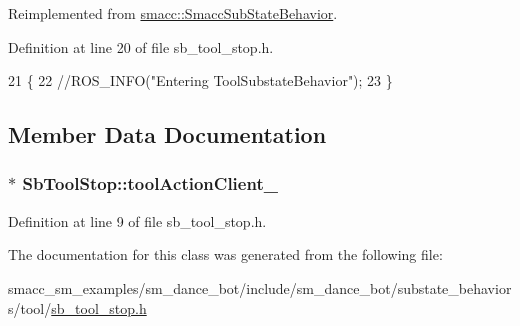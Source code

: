 Reimplemented from \hyperlink{classsmacc_1_1SmaccSubStateBehavior_a1f87ab55c1805b2a2fd9c022807d35b9}{smacc\+::\+Smacc\+Sub\+State\+Behavior}.



Definition at line 20 of file sb\+\_\+tool\+\_\+stop.\+h.


\begin{DoxyCode}
21     \{
22       \textcolor{comment}{//ROS\_INFO("Entering ToolSubstateBehavior");}
23     \}
\end{DoxyCode}


\subsection{Member Data Documentation}
\subsubsection[{\texorpdfstring{tool\+Action\+Client\+\_\+}{toolActionClient_}}]{$\ast$ Sb\+Tool\+Stop\+::tool\+Action\+Client\+\_\+}\hypertarget{classSbToolStop_ad1d7100ab912d6671d09e1ae8e038086}{}\label{classSbToolStop_ad1d7100ab912d6671d09e1ae8e038086}


Definition at line 9 of file sb\+\_\+tool\+\_\+stop.\+h.



The documentation for this class was generated from the following file\+:\begin{DoxyCompactItemize}
\item 
smacc\+\_\+sm\+\_\+examples/sm\+\_\+dance\+\_\+bot/include/sm\+\_\+dance\+\_\+bot/substate\+\_\+behaviors/tool/\hyperlink{sb__tool__stop_8h}{sb\+\_\+tool\+\_\+stop.\+h}\end{DoxyCompactItemize}

